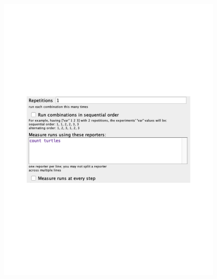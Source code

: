 \documentclass[11pt, oneside]{article}   	%
\begin{document}
\begin{enumerate}
\begin{figure}
\centering
\begin{minipage}{.5\textwidth}
  \centering
  \includegraphics[width=1\linewidth]{default}
\end{minipage}%
\begin{minipage}{.5\textwidth}
  \centering

\end{minipage}
\end{figure}
\end{enumerate}
\end{document}
